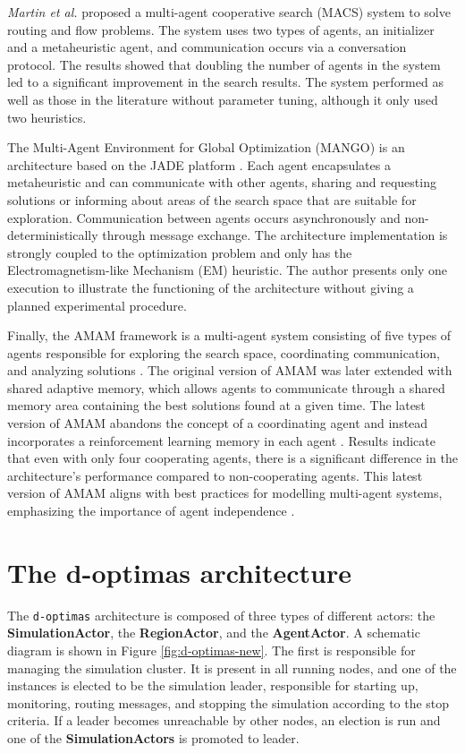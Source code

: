\documentclass[preprint,12pt]{elsarticle}
\begin{document}
\textit{Martin et al.} \cite{martin2016} proposed a multi-agent cooperative search (MACS) system to solve routing and flow problems. The system uses two types of agents, an initializer and a metaheuristic agent, and communication occurs via a conversation protocol. The results showed that doubling the number of agents in the system led to a significant improvement in the search results. The system performed as well as those in the literature without parameter tuning, although it only used two heuristics.

The Multi-Agent Environment for Global Optimization (MANGO) is an architecture based on the JADE platform \cite{kerccelli2008}. Each agent encapsulates a metaheuristic and can communicate with other agents, sharing and requesting solutions or informing about areas of the search space that are suitable for exploration. Communication between agents occurs asynchronously and non-deterministically through message exchange. The architecture implementation is strongly coupled to the optimization problem and only has the Electromagnetism-like Mechanism (EM) heuristic. The author presents only one execution to illustrate the functioning of the architecture without giving a planned experimental procedure.

Finally, the AMAM framework is a multi-agent system consisting of five types of agents responsible for exploring the search space, coordinating communication, and analyzing solutions \cite{silva2007}. The original version of AMAM was later extended with shared adaptive memory, which allows agents to communicate through a shared memory area containing the best solutions found at a given time. The latest version of AMAM abandons the concept of a coordinating agent and instead incorporates a reinforcement learning memory in each agent \cite{fernandes2009}. Results indicate that even with only four cooperating agents, there is a significant difference in the architecture's performance compared to non-cooperating agents. This latest version of AMAM aligns with best practices for modelling multi-agent systems, emphasizing the importance of agent independence \cite{silva2015}.


\section{The d-optimas architecture}
\label{sec:architecture}
The \texttt{d-optimas} architecture is composed of three types of different actors: the \textbf{SimulationActor}, the \textbf{RegionActor}, and the \textbf{AgentActor}. A schematic diagram is shown in Figure \ref{fig:d-optimas-new}. The first is responsible for managing the simulation cluster. It is present in all running nodes, and one of the instances is elected to be the simulation leader, responsible for starting up, monitoring, routing messages, and stopping the simulation according to the stop criteria. If a leader becomes unreachable by other nodes, an election is run and one of the \textbf{SimulationActors} is promoted to leader. 
\end{document}
